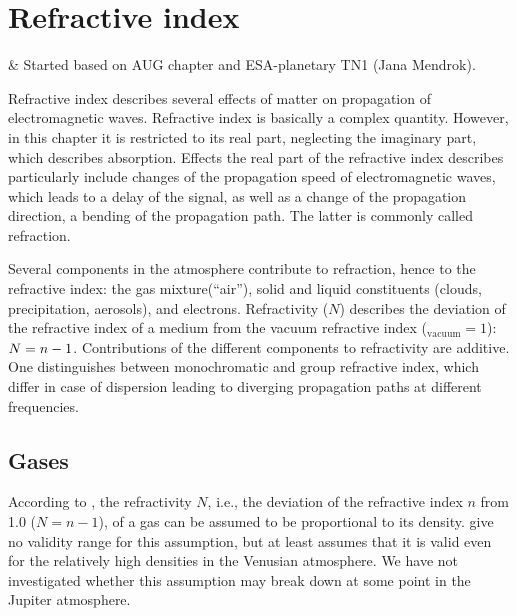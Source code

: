 \chapter{Refractive index}
 \label{sec:rindex_theory}

 & Started based on AUG chapter and ESA-planetary TN1 (Jana Mendrok).\\
\stophistory

Refractive index describes several effects of matter on
propagation of electromagnetic waves. Refractive index is basically a complex
quantity. However, in this chapter it is restricted to its real part, neglecting
the imaginary part, which describes absorption. Effects the real part of the refractive
index describes particularly include changes of the propagation speed of
electromagnetic waves, which leads to a delay of the signal, as well as a change
of the propagation direction, a bending of the propagation path. The latter is
commonly called refraction.

Several components in the atmosphere contribute to refraction, hence to the refractive index: the gas mixture(``air''), solid and liquid constituents (clouds, precipitation, aerosols), and electrons.
Refractivity ($N$) describes the deviation of the refractive index of a medium \Rfr  from the vacuum refractive index (\Rfr$_\mathrm{vacuum}=1$): $N=n-1$. Contributions of the different components to refractivity are additive.
One distinguishes between monochromatic and group refractive index, which
differ in case of dispersion leading to diverging propagation
paths at different frequencies. 



\section{Gases}
 \label{sec:rindex:gases}
%
According to \citet{newell65:_absolute_jap}, the refractivity $N$, i.e., 
the deviation of the refractive index $n$ from 1.0 ($N=n-1$), of a gas
can be assumed to be proportional to its density.
\citet{newell65:_absolute_jap} give no validity range for this
assumption, but at least \citet{stratton68:_optical_jas} assumes that
it is valid even for the relatively high densities in the Venusian
atmosphere. We have not investigated whether this assumption may break
down at some point in the Jupiter atmosphere.

